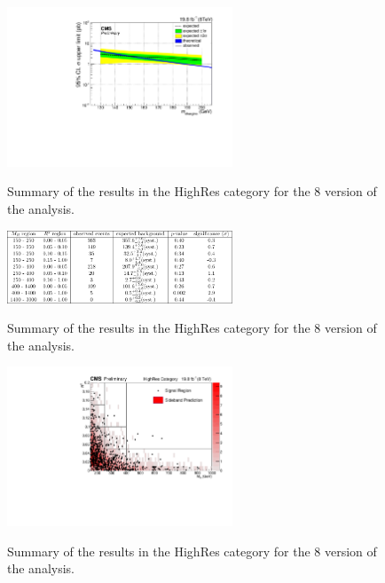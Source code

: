 \begin{figure}[ht!]
\centering
\includegraphics[width=0.6\textwidth,angle=0.]{hgg/expected_exclusion_WH_1D_OBS.pdf}\\
\caption{Summary of the  results in the HighRes category for the 8\TeV
  version of the analysis.
       \label{hgg:limit8TeV}}
\end{figure}
\begin{figure}[ht!]
\centering
\includegraphics[width=0.6\textwidth,angle=0.]{hgg/Table9.pdf}\\
\caption{Summary of the  results in the HighRes category for the 8\TeV
  version of the analysis.
       \label{hgg:table8TeV}}
\end{figure}
\begin{figure}[ht!]
\centering
\includegraphics[width=0.6\textwidth,angle=0.]{hgg/HggRazor_MRRsq_highres_8TeV.pdf}\\
\caption{Summary of the  results in the HighRes category for the 8\TeV
  version of the analysis.
       \label{hgg:highresRazor8TeV}}
\end{figure}
